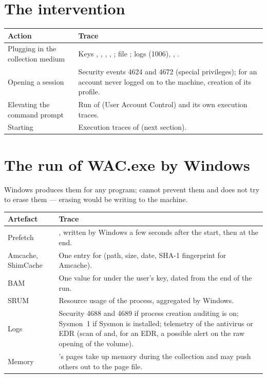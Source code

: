 \documentclass[11pt,a4paper,oneside]{report}
\begin{document}
\section{The intervention}

\begin{longtable}{@{}L{4.3cm}L{10.1cm}@{}}
\toprule
\bfseries Action & \bfseries Trace \\
\midrule
\endhead
Plugging in the collection medium & Keys , ,
  , ,
  ; file ; logs
   (1006),
  , . \\
Opening a session & Security events 4624 and 4672 (special privileges); for
  an account never logged on to the machine, creation of its profile. \\
Elevating the command prompt & Run of  (User Account
  Control) and its own execution traces. \\
Starting  & Execution traces of  (next
  section). \\
\bottomrule
\end{longtable}

\section{The run of WAC.exe by Windows}

Windows produces them for any program; \wac{} cannot prevent them and does
not try to erase them — erasing would be writing to the machine.

\begin{longtable}{@{}L{4.3cm}L{10.1cm}@{}}
\toprule
\bfseries Artefact & \bfseries Trace \\
\midrule
\endhead
Prefetch & , written by Windows a few seconds after the start, then
  at the end. \\
Amcache, ShimCache & One entry for  (path, size, date, SHA-1
  fingerprint for Amcache). \\
BAM & One value for  under the user's key, dated from the end
  of the run. \\
SRUM & Resource usage of the process, aggregated by Windows. \\
Logs & Security 4688 and 4689 if process creation auditing is on; Sysmon~1 if
  Sysmon is installed; telemetry of the antivirus or EDR (scan of
   and, for an EDR, a possible alert on the raw opening of the
  volume). \\
Memory & \wac{}'s pages take up memory during the collection and may push
  others out to the page file. \\
\bottomrule
\end{longtable}
\end{document}
